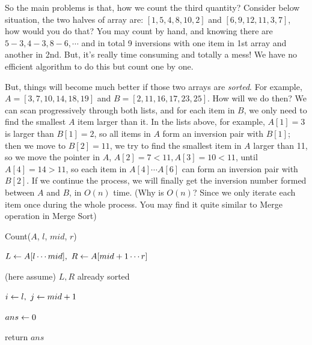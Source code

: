 \documentclass[11pt, a4paper]{COMP3711}
\begin{document}
\begin{spacing}{1.5}
    So the main problems is that, how we count the third quantity?
    Consider below situation, the two halves of array are:
    $[1,5,4,8,10,2]$ and $[6,9,12,11,3,7]$, how would you do that?
    You may count by hand, and knowing there are $5-3, 4-3, 8-6, \cdots$
    and in total 9 inversions with one item in 1st array and another in 
    2nd. But, it's really time consuming and totally a mess! We have 
    no efficient algorithm to do this but count one by one.

    But, things will become much better if those two arrays are 
    {\it sorted}. For example, $A=[3,7,10,14,18,19]$ and 
    $B=[2,11,16,17,23,25]$. How will we do then? We can 
    scan progressively through both lists, and for each item 
    in $B$, we only need to find the smallest $A$ item 
    larger than it. In the lists above, for example, $A[1]=3$
    is larger than $B[1]=2$, so all items in $A$ form an inversion pair 
    with $B[1]$; then we move to $B[2]=11$, we try to find the smallest 
    item in $A$ larger than 11, so we move the pointer in $A$, 
    $A[2]=7<11, A[3]=10<11$, until $A[4]=14>11$, so 
    each item in $A[4]\cdots A[6]$ can form an inversion pair with $B[2]$.
    If we continue the process, we will finally get the inversion 
    number formed between $A$ and $B$, in $O(n)$ time. (Why is $O(n)$?
    Since we only iterate each item once during the whole process.
    You may find it quite similar to Merge operation in Merge Sort)

    \begin{algorithm*}
        \caption{Count($A$, $l$, $mid$, $r$)}
        $L\leftarrow A[l\cdots mid],\ R\leftarrow A[mid+1\cdots r]$

        (here assume) $L, R$ already sorted

        $i\leftarrow l,\ j\leftarrow mid+1$\qquad {}

        $ans\leftarrow 0$ \qquad {}

        return $ans$
    \end{algorithm*}
\end{spacing}
\end{document}
